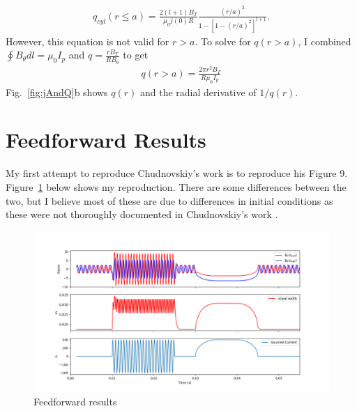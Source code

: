 \documentclass{article}
\begin{document}
\begin{equation} \label{qCylindrical}
\begin{split}
q_{cyl}(r\leq a)=\frac{2(l+1)B_T}{\mu_0 j(0) R} \frac{(r/a)^2}{1-\left[ 1-(r/a)^2\right]^{l+1}}.
\end{split} 
\end{equation} 
However, this equation is not valid for $r>a$.  To solve for $q(r>a)$, I combined $\oint B_{\theta} dl = \mu_0 I_p$ and $q=\frac{rB_T}{RB_{\theta}}$ to get 
\begin{equation} \label{qCylindrical}
\begin{split}
q(r>a)=\frac{2\pi r^2B_T}{R\mu_0I_p}
\end{split} 
\end{equation} 
Fig.~\ref{fig:jAndQ}b shows $q(r)$ and the radial derivative of $1/q(r)$.  


\section{Feedforward Results}

My first attempt to reproduce Chudnovskiy's work \cite{2003} is to reproduce his Figure 9.  Figure~\ref{fig:FFResults} below shows my reproduction.  There are some differences between the two, but I believe most of these are due to differences in initial conditions as these were not thoroughly documented in Chudnovskiy's work \cite{2003}.  

\begin{figure}[htb]
	\includegraphics[width=15cm]{images/feedforwardResults.png}
	\caption{Feedforward results
		\label{fig:FFResults}}    
\end{figure} 



\end{document}
